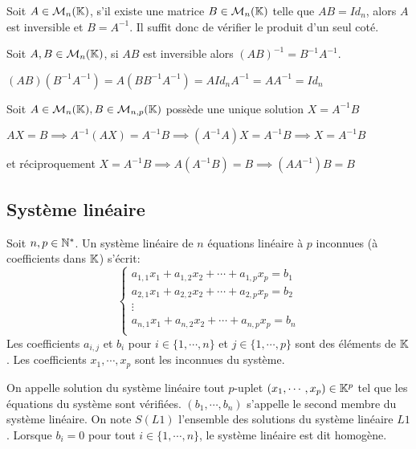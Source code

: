 \documentclass[a4paper, 12pt]{article}
\begin{document}
\begin{proposition}
    Soit $A \in \mathcal{M}_n(\mathbb{K})$, s'il existe une matrice $B \in \mathcal{M}_n(\mathbb{K})$ telle que $AB = Id_n$, alors $A$ est inversible et $B = A^{-1}$.
    Il suffit donc de vérifier le produit d'un seul coté.
\end{proposition}

\begin{proposition}
    Soit $A, B \in \mathcal{M}_n(\mathbb{K})$, si $AB$ est inversible alors $(AB)^{-1} = B^{-1}A^{-1}$.
\end{proposition}

\begin{demonstration}
    $(AB)(B^{-1}A^{-1}) = A(BB^{-1}A^{-1}) = AId_nA^{-1} = AA^{-1} = Id_n$
\end{demonstration}

\begin{proposition}
    Soit $A \in \mathcal{M}_n(\mathbb{K}), B \in \mathcal{M}_{n,p}(\mathbb{K})$ possède une unique solution $X = A^{-1}B$
\end{proposition}

\begin{demonstration}
    $AX = B \implies A^{-1}(AX) = A^{-1}B \implies (A^{-1}A)X = A^{-1}B \implies X = A^{-1}B$
    
    et réciproquement
    $X = A^{-1}B \implies A(A^{-1}B) = B \implies (AA^{-1})B = B$
\end{demonstration}

\subsection{Système linéaire}

\begin{definition}
    Soit $n, p \in \mathbb{N}^*$. Un système linéaire de $n$ équations linéaire à $p$ inconnues (à coefficients dans $\mathbb{K}$) s'écrit:
    $$
    \begin{cases}
        a_{1,1}x_1 + a_{1,2}x_2 + \cdots + a_{1,p}x_p = b_1 \\
        a_{2,1}x_1 + a_{2,2}x_2 + \cdots + a_{2,p}x_p = b_2 \\
        \vdots \\
        a_{n,1}x_1 + a_{n,2}x_2 + \cdots + a_{n,p}x_p = b_n \\
    \end{cases}
    $$
    Les coefficients $a_{i,j}$ et $b_i$ pour $i \in \{1, \cdots, n\}$ et $j \in \{1, \cdots, p\}$ sont des éléments de $\mathbb{K}$.
    Les coefficients $x_1, \cdots, x_p$ sont les inconnues du système.

    On appelle solution du système linéaire tout $p$-uplet $(x_1, \cdots, x_p) \in \mathbb{K}^p$ tel que les équations du système sont vérifiées.
    $(b_1, \cdots, b_n)$ s'appelle le second membre du système linéaire.
    On note $S(L1)$ l'ensemble des solutions du système linéaire $L1$.
    Lorsque $b_i = 0$ pour tout $i \in \{1, \cdots, n\}$, le système linéaire est dit homogène.
\end{definition}
\end{document}
